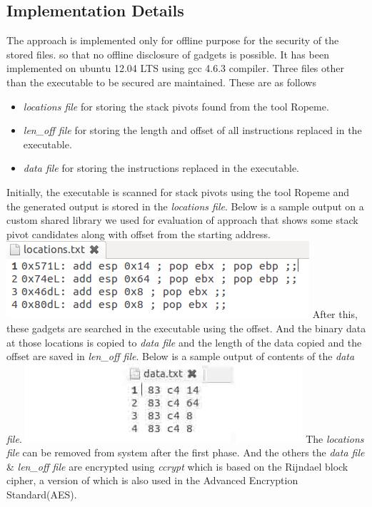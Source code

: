 \documentclass{article}
\begin{document}
\begin{multicols}{2}
	\subsection{Implementation Details}
	The approach is implemented only for offline purpose for the security of the stored files. so that no offline disclosure of gadgets is possible. It has been implemented on ubuntu 12.04 LTS using gcc 4.6.3 compiler. \break Three files other than the executable to be secured are maintained. These are as follows
	\begin{itemize}
		\item \textit{locations file} for storing the stack pivots found from the tool Ropeme\cite{ropeme}.
		\item \textit{len\_off file} for storing the length and offset of all instructions replaced in the executable.
		\item \textit{data file} for storing the instructions replaced in the executable.
	\end{itemize}
	Initially, the executable is scanned for stack pivots using the tool Ropeme\cite{ropeme} and the generated output is stored in the \textit{locations file}. Below is a sample output on a custom shared library we used for evaluation of approach that shows some stack pivot candidates along with offset from the starting address.\break \break
	\includegraphics[scale=.55]{locations.png}
	\captionof{figure}{\textit{locations file}}
	After this, these gadgets are searched in the executable using the offset. And the binary data at those locations is copied to \textit{data file} and the length of the data copied and the offset are saved in \textit{len\_off file}. Below is a sample output of contents of the \textit{data file}.\break \break
	\includegraphics[scale=.5]{data.jpg}
	The \textit{locations file} can be removed from system after the first phase. And the others the \textit{data file} \& \textit{len\_off file} are encrypted using \textit{ccrypt} which is based on the Rijndael block cipher, a version of which is also used in the Advanced Encryption Standard(AES).
	

\end{multicols}
\end{document}
